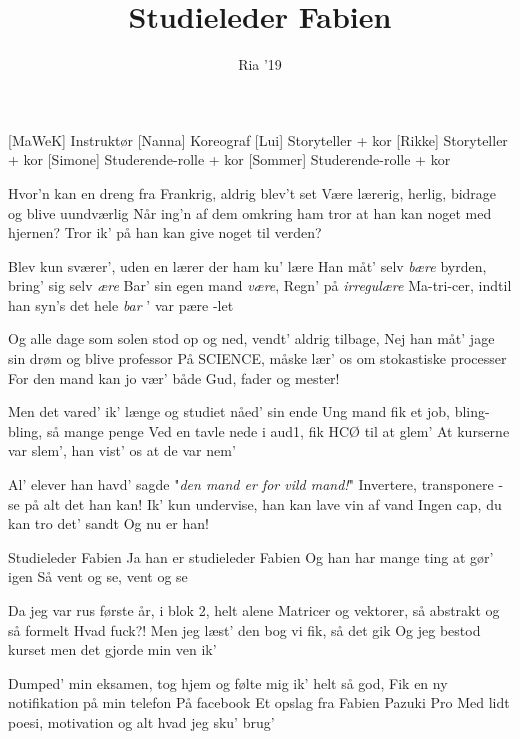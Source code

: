 \documentclass[a4paper,11pt]{article}
\title{Studieleder Fabien}
\author{Ria '19}
\begin{document}
\maketitle

\begin{roles}
[MaWeK] Instruktør
[Nanna] Koreograf
[Lui] Storyteller + kor
[Rikke] Storyteller + kor
[Simone] Studerende-rolle + kor
[Sommer] Studerende-rolle + kor
\end{roles}



\begin{song}
 Hvor'n kan en dreng fra Frankrig, aldrig blev't set
Være lærerig, herlig, bidrage og blive uundværlig
Når ing'n af dem omkring ham tror at han kan noget med hjernen?
Tror ik' på han kan give noget til verden?

 Blev kun sværer', uden en lærer der ham ku' lære
Han måt' selv \emph{bære} byrden, bring' sig selv \emph{ære}
Bar' sin egen mand \emph{være},
Regn' på \emph{irregulære}
Ma-tri-cer, indtil han syn's det hele \emph{bar} ' var pære
-let

 Og alle dage som solen stod op og ned, vendt' aldrig tilbage,
Nej han måt' jage sin drøm og blive professor
På SCIENCE, måske lær' os om stokastiske processer
For den mand kan jo vær' både Gud, fader og mester!

 Men det vared' ik' længe og studiet nåed' sin ende
Ung mand fik et job, bling-bling, så mange penge
Ved en tavle nede i aud1, fik HCØ til at glem'
At kurserne var slem', han vist' os at de var nem'

 Al' elever han havd' sagde "\emph{den mand er for vild mand!}"
Invertere, transponere - se på alt det han kan!
Ik' kun undervise, han kan lave vin af vand
Ingen cap, du kan tro det' sandt
Og nu er han!

 Studieleder Fabien
Ja han er studieleder Fabien
Og han har mange ting at gør' igen
Så vent og se, vent og se

 Da jeg var rus første år, i blok 2, helt alene
Matricer og vektorer, så abstrakt og så formelt
Hvad fuck?! Men jeg læst' den bog vi fik, så det gik
 Og jeg bestod kurset men det gjorde min ven ik'

 Dumped' min eksamen, tog hjem og følte mig ik' helt så god,
Fik en ny notifikation på min telefon
På facebook
 Et opslag fra Fabien Pazuki Pro
 Med lidt poesi, motivation og alt hvad jeg sku' brug'


\end{song}
\end{document}
